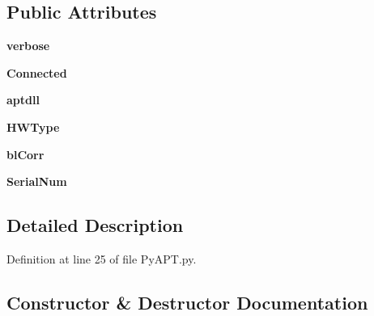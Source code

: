 \subsection*{Public Attributes}
\begin{DoxyCompactItemize}
\item 
{\bfseries verbose}\hypertarget{class_py_a_p_t_1_1_a_p_t_motor_acc3eb0fd5f3e6bd8119a8363c5994793}{}\label{class_py_a_p_t_1_1_a_p_t_motor_acc3eb0fd5f3e6bd8119a8363c5994793}

\item 
{\bfseries Connected}\hypertarget{class_py_a_p_t_1_1_a_p_t_motor_a64eed7e16d6b400ffc87e20e7a683d2f}{}\label{class_py_a_p_t_1_1_a_p_t_motor_a64eed7e16d6b400ffc87e20e7a683d2f}

\item 
{\bfseries aptdll}\hypertarget{class_py_a_p_t_1_1_a_p_t_motor_aa87c1143006f8e0e89c847f1ad25cb0c}{}\label{class_py_a_p_t_1_1_a_p_t_motor_aa87c1143006f8e0e89c847f1ad25cb0c}

\item 
{\bfseries H\+W\+Type}\hypertarget{class_py_a_p_t_1_1_a_p_t_motor_a030052faad92d52eff6eb7c76a9ba259}{}\label{class_py_a_p_t_1_1_a_p_t_motor_a030052faad92d52eff6eb7c76a9ba259}

\item 
{\bfseries bl\+Corr}\hypertarget{class_py_a_p_t_1_1_a_p_t_motor_aa785cbe9edcff2bd80c3da94ba7e05ad}{}\label{class_py_a_p_t_1_1_a_p_t_motor_aa785cbe9edcff2bd80c3da94ba7e05ad}

\item 
{\bfseries Serial\+Num}\hypertarget{class_py_a_p_t_1_1_a_p_t_motor_a8028b6e3e4a458fc0f2a4202531a50ec}{}\label{class_py_a_p_t_1_1_a_p_t_motor_a8028b6e3e4a458fc0f2a4202531a50ec}

\end{DoxyCompactItemize}


\subsection{Detailed Description}


Definition at line 25 of file Py\+A\+P\+T.\+py.



\subsection{Constructor \& Destructor Documentation}
